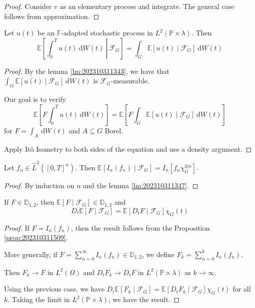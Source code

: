 \begin{proof}
	Consider $v$ as an elementary process and integrate. The general case follows from approximation.
\end{proof}

\begin{lemma}\label{lm:202310311347}
	Let $u(t)$ be an $\mathbb{F}$-adapted stochastic process in $L^2(\mathbb{P} \times \lambda)$. Then 
	$$
	\mathbb{E} \left[ \left.\int_0^T u(t) ~\mathrm{d}W(t) ~\right| ~\mathcal{F}_G \right] = \int_G \mathbb{E} [u(t) \mid \mathcal{F}_G] ~\mathrm{d} W(t)
	$$
\end{lemma}

\begin{proof}
	By the lemma \ref{lm:202310311343}, we have that $\int_G \mathbb{E} [u(t) \mid \mathcal{F}_G] ~\mathrm{d} W(t)$ is $\mathcal{F}_G$-measurable. 

	Our goal is to verify
	$$
	\mathbb{E} \left[ F \int_0^T u(t) ~\mathrm{d}W(t) \right] = \mathbb{E} \left[ F \int_G \mathbb{E}[u(t) \mid \mathcal{F}_G] ~\mathrm{d}W(t) \right]
	$$
	for $F = \int_A ~\mathrm{d}W(t)$ and $A \subseteq G$ Borel. 

	Apply Itô Isometry to both sides of the equation and use a density argument. 

\end{proof}

\begin{proposition}\label{prop:202310311509} 
	Let $f_n \in \hat{L}^2([0,T]^n)$. Then $\mathbb{E}[I_n(f_n) \mid \mathcal{F}_G] = I_n[f_n \chi_G^{\otimes n}]$.
\end{proposition}

\begin{proof}
	By induction on $n$ and the lemma \ref{lm:202310311347}.
\end{proof}

\begin{proposition}\label{prop:202310311506} 
	If $F \in  \mathbb{D}_{1,2}$, then $\mathbb{E}[F \mid \mathcal{F}_G] \in \mathbb{D}_{1,2}$ and 
	$$
	D_t \mathbb{E}[F \mid \mathcal{F}_G] = \mathbb{E}[D_t F \mid \mathcal{F}_G] \chi_G(t)
	$$
\end{proposition}

\begin{proof}
	If $F = I_n(f_n)$, then the result follows from the Proposition \ref{prop:202310311509}. 

	More generally, if $F = \sum_{n=0}^\infty I_n(f_n) \in \mathbb{D}_{1,2}$, we define $F_k = \sum_{n=0}^k I_n(f_n)$.

	Then $F_k \to F$ in $L^2(\Omega)$ and $D_t F_k \to D_t F$ in $L^2(\mathbb{P} \times \lambda)$ as $k \to \infty$. 

	Using the previous case, we have $D_t \mathbb{E}[F_k \mid \mathcal{F}_G] = \mathbb{E}[D_t F_k \mid \mathcal{F}_G] \chi_G(t)$ for all $k$. Taking the limit in $L^2(\mathbb{P} \times \lambda)$, we have the result. 
\end{proof}

